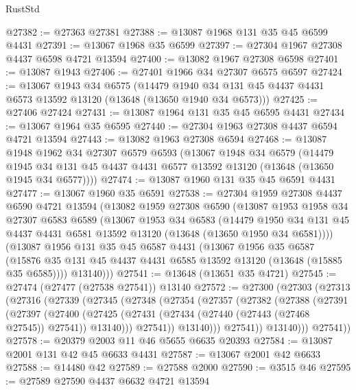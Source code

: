 \begin{lexlean}{RustStd}
\begin{coremodule}
@27382 := @27363 @27381
@27388 := @13087 @1968 @131 @35 @45 @6599 @4431
@27391 := @13067 @1968 @35 @6599
@27397 := @27304 @1967 @27308 @4437 @6598 @4721 @13594
@27400 := @13082 @1967 @27308 @6598
@27401 := @13087 @1943
@27406 := @27401 @1966 @34 @27307 @6575 @6597
@27424 := @13067
    @1943
    @34
    @6575
    (@14479 @1940 @34 @131 @45 @4437 @4431 @6573 @13592 @13120 (@13648 (@13650 @1940 @34 @6573)))
@27425 := @27406 @27424
@27431 := @13087 @1964 @131 @35 @45 @6595 @4431
@27434 := @13067 @1964 @35 @6595
@27440 := @27304 @1963 @27308 @4437 @6594 @4721 @13594
@27443 := @13082 @1963 @27308 @6594
@27468 := @13087
    @1948
    @1962
    @34
    @27307
    @6579
    @6593
    (@13067
      @1948
      @34
      @6579
      (@14479 @1945 @34 @131 @45 @4437 @4431 @6577 @13592 @13120 (@13648 (@13650 @1945 @34 @6577))))
@27474 := @13087 @1960 @131 @35 @45 @6591 @4431
@27477 := @13067 @1960 @35 @6591
@27538 := @27304
    @1959
    @27308
    @4437
    @6590
    @4721
    @13594
    (@13082
      @1959
      @27308
      @6590
      (@13087
        @1953
        @1958
        @34
        @27307
        @6583
        @6589
        (@13067
          @1953
          @34
          @6583
          (@14479
            @1950
            @34
            @131
            @45
            @4437
            @4431
            @6581
            @13592
            @13120
            (@13648 (@13650 @1950 @34 @6581))))
        (@13087
          @1956
          @131
          @35
          @45
          @6587
          @4431
          (@13067
            @1956
            @35
            @6587
            (@15876 @35 @131 @45 @4437 @4431 @6585 @13592 @13120 (@13648 (@15885 @35 @6585))))
          @13140)))
@27541 := @13648 (@13651 @35 @4721)
@27545 := @27474 (@27477 (@27538 @27541)) @13140
@27572 := @27300
    (@27303
      (@27313
        (@27316
          (@27339
            (@27345
              (@27348
                (@27354
                  (@27357
                    (@27382
                      (@27388
                        (@27391
                          (@27397
                            (@27400
                              (@27425
                                (@27431 (@27434 (@27440 (@27443 (@27468 @27545)) @27541)) @13140)))
                            @27541))
                        @13140)))
                  @27541))
              @13140)))
        @27541))
@27578 := @20379 @2003 @11 @46 @5655 @6635 @20393
@27584 := @13087 @2001 @131 @42 @45 @6633 @4431
@27587 := @13067 @2001 @42 @6633
@27588 := @14480 @42
@27589 := @27588 @2000
@27590 := @3515 @46
@27595 := @27589 @27590 @4437 @6632 @4721 @13594

\end{coremodule}
\end{lexlean}
